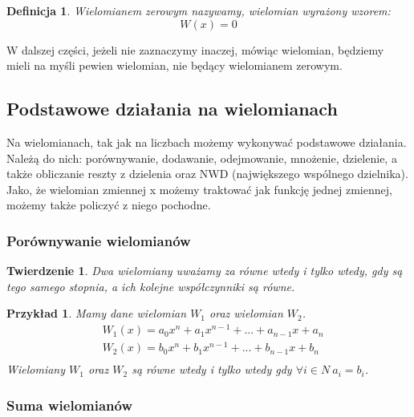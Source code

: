 \documentclass[twoside,a4paper]{book}
\newtheorem{theorem}{Twierdzenie}
\newtheorem{definition}{Definicja}
\newtheorem{example}{Przykład}
\begin{document}
\begin{definition}
	Wielomianem zerowym nazywamy, wielomian wyrażony wzorem:
	\begin{equation}
		W(x) = 0
	\end{equation}
\end{definition}

W dalszej części, jeżeli nie zaznaczymy inaczej, mówiąc wielomian, będziemy mieli na myśli pewien wielomian, nie będący wielomianem zerowym.

\subsection{Podstawowe działania na wielomianach}

Na wielomianach, tak jak na liczbach możemy wykonywać podstawowe działania. Należą do nich: porównywanie, dodawanie, odejmowanie, mnożenie, dzielenie, a także obliczanie reszty z dzielenia oraz NWD (największego wspólnego dzielnika). Jako, że wielomian zmiennej x możemy traktować jak funkcję jednej zmiennej, możemy także policzyć z niego pochodne.

\subsubsection{Porównywanie wielomianów}

\begin{theorem}
	Dwa wielomiany uważamy za równe wtedy i tylko wtedy, gdy są tego samego stopnia, a ich kolejne współczynniki są równe.
\end{theorem}

\begin{example}
	Mamy dane wielomian $W_1$ oraz wielomian $W_2$.
	\begin{equation}
		\begin{split}
			&W_1(x) = a_0x^n + a_1x^{n-1} + ... + a_{n-1}x + a_n \\
			&W_2(x) = b_0x^n + b_1x^{n-1} + ... + b_{n-1}x + b_n \\
		\end{split}
	\end{equation}
	Wielomiany $W_1$ oraz $W_2 $ są równe wtedy i tylko wtedy gdy
	$\forall{i\in N}\ a_i = b_i$.
\end{example}

\subsubsection{Suma wielomianów}
\end{document}
